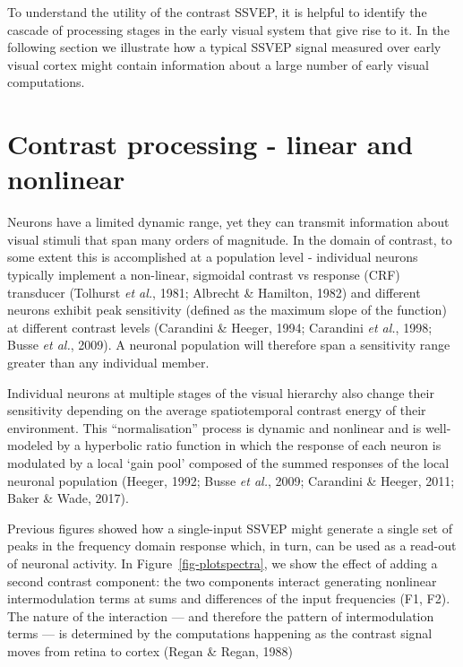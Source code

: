 \documentclass[
  letterpaper,
  DIV=11,
  numbers=noendperiod]{scrartcl}
\begin{document}
To understand the utility of the contrast SSVEP, it is helpful to
identify the cascade of processing stages in the early visual system
that give rise to it. In the following section we illustrate how a
typical SSVEP signal measured over early visual cortex might contain
information about a large number of early visual computations.

\section{Contrast processing - linear and
nonlinear}\label{contrast-processing---linear-and-nonlinear}

Neurons have a limited dynamic range, yet they can transmit information
about visual stimuli that span many orders of magnitude. In the domain
of contrast, to some extent this is accomplished at a population level -
individual neurons typically implement a non-linear, sigmoidal contrast
vs response (CRF) transducer (Tolhurst \emph{et al.}, 1981; Albrecht \&
Hamilton, 1982) and different neurons exhibit peak sensitivity (defined
as the maximum slope of the function) at different contrast levels
(Carandini \& Heeger, 1994; Carandini \emph{et al.}, 1998; Busse
\emph{et al.}, 2009). A neuronal population will therefore span a
sensitivity range greater than any individual member.

Individual neurons at multiple stages of the visual hierarchy also
change their sensitivity depending on the average spatiotemporal
contrast energy of their environment. This ``normalisation'' process is
dynamic and nonlinear and is well-modeled by a hyperbolic ratio function
in which the response of each neuron is modulated by a local `gain pool'
composed of the summed responses of the local neuronal population
(Heeger, 1992; Busse \emph{et al.}, 2009; Carandini \& Heeger, 2011;
Baker \& Wade, 2017).

Previous figures showed how a single-input SSVEP might generate a single
set of peaks in the frequency domain response which, in turn, can be
used as a read-out of neuronal activity. In
Figure~\ref{fig-plotspectra}, we show the effect of adding a second
contrast component: the two components interact generating nonlinear
intermodulation terms at sums and differences of the input frequencies
(F1, F2). The nature of the interaction --- and therefore the pattern of
intermodulation terms --- is determined by the computations happening as
the contrast signal moves from retina to cortex (Regan \& Regan, 1988)
\end{document}
